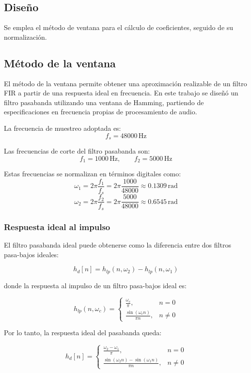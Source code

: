 \documentclass[a4,11pt]{article}
\begin{document}
\subsection{Diseño}
\label{subsec:diseno}

Se emplea el método de ventana para el cálculo de coeficientes, seguido de su normalización.
\subsection{Método de la ventana}
\label{sec:metodo_ventana}

El método de la ventana permite obtener una aproximación realizable de un filtro FIR a partir de una respuesta ideal en frecuencia. En este trabajo se diseñó un filtro pasabanda utilizando una ventana de Hamming, partiendo de especificaciones en frecuencia propias de procesamiento de audio.

La frecuencia de muestreo adoptada es:
\[
f_s = 48000 \, \text{Hz}
\]

Las frecuencias de corte del filtro pasabanda son:
\[
f_1 = 1000 \, \text{Hz}, \qquad f_2 = 5000 \, \text{Hz}
\]

Estas frecuencias se normalizan en términos digitales como:
\[
\omega_1 = 2\pi \frac{f_1}{f_s} = 2\pi \frac{1000}{48000} \approx 0.1309 \, \text{rad}
\]
\[
\omega_2 = 2\pi \frac{f_2}{f_s} = 2\pi \frac{5000}{48000} \approx 0.6545 \, \text{rad}
\]

\subsubsection{Respuesta ideal al impulso}

El filtro pasabanda ideal puede obtenerse como la diferencia entre dos filtros pasa-bajos ideales:

\[
h_d[n] = h_{lp}(n, \omega_2) - h_{lp}(n, \omega_1)
\]

donde la respuesta al impulso de un filtro pasa-bajos ideal es:

\[
h_{lp}(n, \omega_c) =
\begin{cases}
\frac{\omega_c}{\pi}, & n = 0 \\
\frac{\sin(\omega_c n)}{\pi n}, & n \neq 0
\end{cases}
\]

Por lo tanto, la respuesta ideal del pasabanda queda:

\[
h_d[n] =
\begin{cases}
\frac{\omega_2 - \omega_1}{\pi}, & n = 0 \\
\frac{\sin(\omega_2 n) - \sin(\omega_1 n)}{\pi n}, & n \neq 0
\end{cases}
\]
\end{document}
